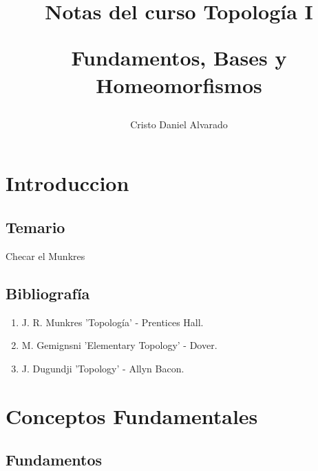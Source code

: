 \documentclass[12pt]{report}
\theoremstyle{largebreak}
\begin{document}
    \setlength{\parskip}{5pt} %
    \setlength{\parindent}{12pt} %
    \title{Notas del curso Topología I
    
    Fundamentos, Bases y Homeomorfismos}
    \author{Cristo Daniel Alvarado}
    \maketitle

    \tableofcontents %

    \setcounter{chapter}{-1} %
    
    \chapter{Introduccion}
    
    \section{Temario}
    
    Checar el Munkres

    \section{Bibliografía}    

    \begin{enumerate}
        \item J. R. Munkres 'Topología' - Prentices Hall.
        \item M. Gemignsni 'Elementary Topology' -  Dover.
        \item J. Dugundji 'Topology' -  Allyn Bacon.
    \end{enumerate}

    \chapter{Conceptos Fundamentales}

    \section{Fundamentos}
\end{document}
